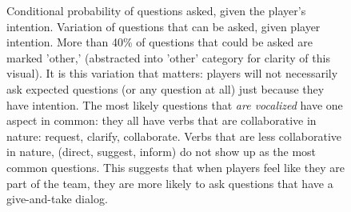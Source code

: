 \begin{figure}[h!]
    \centering
    \caption{Conditional probability of questions asked, given the player's intention. Variation of questions that can be asked, given player intention. More than 40\% of questions that could be asked are marked 'other,' (abstracted into 'other' category for clarity of this visual). It is this variation that matters: players will not necessarily ask expected questions (or any question at all) just because they have intention. The most likely questions that \emph{are vocalized} have one aspect in common: they all have verbs that are collaborative in nature: request, clarify, collaborate. Verbs that are less collaborative in nature, (direct, suggest, inform) do not show up as the most common questions. This suggests that when players feel like they are part of the team, they are more likely to ask questions that have a give-and-take dialog.}
\end{figure}

